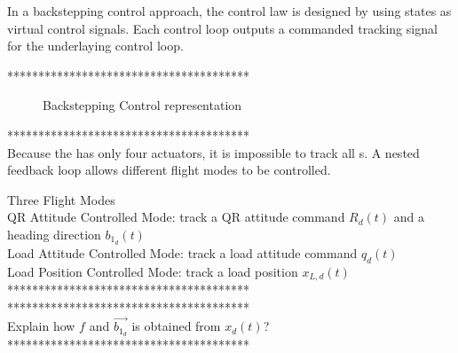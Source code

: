In a backstepping control approach, the control law is designed by using states as virtual control signals. Each control loop outputs a commanded tracking signal for the underlaying control loop.

***************************************\\
\begin{figure}[h!]
	\centering
	\caption{Backstepping Control representation\label{fig:backstep}}
\end{figure}		


%
%

***************************************\\
Because the  has only four actuators, it is impossible to track all s. A nested feedback loop allows different flight modes to be controlled.

Three Flight Modes\\
QR Attitude Controlled Mode: track a QR attitude command $ R_d(t) $ and a heading direction $ b_{1_d}(t) $ \\
Load Attitude Controlled Mode: track a load attitude command $ q_d(t) $ \\
Load Position Controlled Mode: track a load position $ x_{L,d}(t) $\\

***************************************\\


***************************************\\
Explain how $ f $ and $ \vec{b_{1_d}} $ is obtained from $ x_d(t) $?\\

***************************************\\


